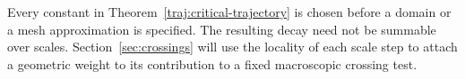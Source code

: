 Every constant in Theorem~\ref{traj:critical-trajectory} is chosen
before a domain or a mesh approximation is specified.  The resulting
decay need not be summable over scales.  Section~\ref{sec:crossings}
will use the locality of each scale step to attach a geometric weight
to its contribution to a fixed macroscopic crossing test.
